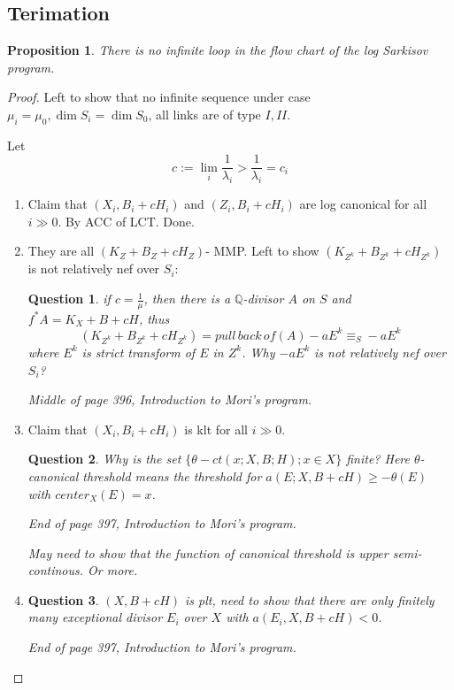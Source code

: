 \documentclass{article}
\newtheorem{prop}[defn]{Proposition}
\newtheorem*{ques}{Question}
\begin{document}
\subsection{Terimation}
	\begin{prop}
		There is no infinite loop in the flow chart of the log Sarkisov program.
\end{prop}
\begin{proof}
Left to show that no infinite sequence under case $ \mu_i=\mu_0, \dim S_i=\dim S_0 $, all links are of type $ I,II $.
	
Let
		$$ c:=\lim_{i}\frac{1}{\lambda_i}>\frac{1}{\lambda_i}=c_i $$
		\begin{enumerate}[Step 1]
			\item Claim that $ (X_i,B_i+cH_i) $ and $ (Z_i,B_i+cH_i) $ are log canonical for all $ i\gg 0 $. By ACC of LCT. Done.
			\item They are all $ (K_{Z}+B_{Z}+cH_{Z}) $- MMP. Left to show $ (K_{Z^k}+B_{Z^k}+cH_{Z^k}) $ is not relatively nef over $ S_i $:
			\begin{ques}
				if $ c=\frac{1}{\mu} $, then there is a $ \mathbb{Q} $-divisor $ A $ on $ S $ and $ f^*A=K_X+B+cH $, thus 
				$$ (K_{Z^k}+B_{Z^k}+cH_{Z^k})=pull\,back\,of (A)-aE^k\equiv_S -aE^k $$
				where $ E^k $ is strict transform of $ E $ in $ Z^k $. Why $ -aE^k $ is not relatively nef over $ S_i $?
				
				Middle of page 396, Introduction to Mori's program. 
		\end{ques}
			\item Claim that $ (X_i,B_i+cH_i) $ is klt for all $ i\gg 0 $. 
			\begin{ques}
				Why is  the set $\{ \theta-ct(x;X,B;H);x\in X\} $  finite? Here $ \theta $-canonical threshold means the threshold for $ a(E;X,B+cH)\geqslant-\theta(E) $ with $ center_X(E)=x $.
				
				End of page 397, Introduction to Mori's program. 
				
				May need to show that the function of canonical threshold is upper semi-continous. Or more.
			\end{ques}
			\item
			\begin{ques}
				$ (X,B+cH) $ is plt, need to show that there are only finitely many exceptional divisor $ E_i $ over $ X $ with $ a(E_i,X,B+cH)<0 $.
				
				End of page 397, Introduction to Mori's program. 
			\end{ques}
		\end{enumerate}
	\end{proof}
	
\end{document}

